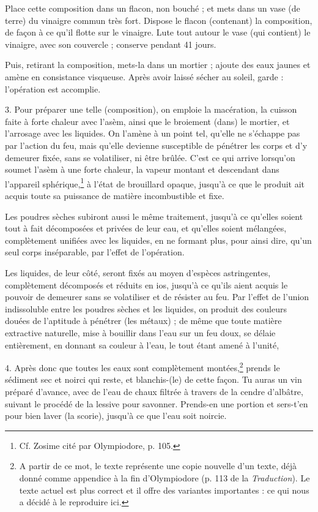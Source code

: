 \documentclass[a4paper, 11pt, oneside, polutonikogreek, french]{article}
\begin{document}
Place cette composition dans un flacon, non bouché ; et mets dans un vase (de terre) du vinaigre commun très fort. Dispose le flacon (contenant) la composition, de façon à ce qu'il flotte sur le vinaigre. Lute tout autour le vase (qui contient) le vinaigre, avec son couvercle ; conserve pendant 41 jours.

Puis, retirant la composition, mets-la dans un mortier ; ajoute des eaux jaunes et amène en consistance visqueuse. Après avoir laissé sécher au soleil, garde : l'opération est accomplie.

3. Pour préparer une telle (composition), on emploie la macération, la cuisson faite à forte chaleur avec l'asèm, ainsi que le broiement (dans) le mortier, et l'arrosage avec les liquides. On l'amène à un point tel, qu'elle ne s'échappe pas par l'action du feu, mais qu'elle devienne susceptible de pénétrer les corps et d'y demeurer fixée, sans se volatiliser, ni être brûlée. C'est ce qui arrive lorsqu'on soumet l'asèm à une forte chaleur, la vapeur montant et descendant dans l'appareil sphérique,\footnote{Cf. Zosime cité par Olympiodore, p. 105.} à l'état de brouillard opaque, jusqu'à ce que le produit ait acquis toute sa puissance de matière incombustible et fixe.

Les poudres sèches subiront aussi le même traitement, jusqu'à ce qu'elles soient tout à fait décomposées et privées de leur eau, et qu'elles soient mélangées, complètement unifiées avec les liquides, en ne formant plus, pour ainsi dire, qu'un seul corps inséparable, par l'effet de l'opération.

Les liquides, de leur côté, seront fixés au moyen d'espèces astringentes, complètement décomposés et réduits en ios, jusqu'à ce qu'ils aient acquis le pouvoir de demeurer sans se volatiliser et de résister au feu. Par l'effet de l'union indissoluble entre les poudres sèches et les liquides, on produit des couleurs douées de l'aptitude à pénétrer (les métaux) ; de même que toute matière extractive naturelle, mise à bouillir dans l'eau sur un feu doux, se délaie entièrement, en donnant sa couleur à l'eau, le tout étant amené à l'unité,

4. Après donc que toutes les eaux sont complètement montées,\footnote{A partir de ce mot, le texte représente une copie nouvelle d'un texte, déjà donné comme appendice à la fin d'Olympiodore (p. 113 de la \emph{Traduction}). Le texte actuel est plus correct et il offre des variantes importantes : ce qui nous a décidé à le reproduire ici.} prends le sédiment sec et noirci qui reste, et blanchis-(le) de cette façon. Tu auras un vin préparé d'avance, avec de l'eau de chaux filtrée à travers de la cendre d'albâtre, suivant le procédé de la lessive pour savonner. Prends-en une portion et sers-t'en pour bien laver (la scorie), jusqu'à ce que l'eau soit noircie.
\end{document}
